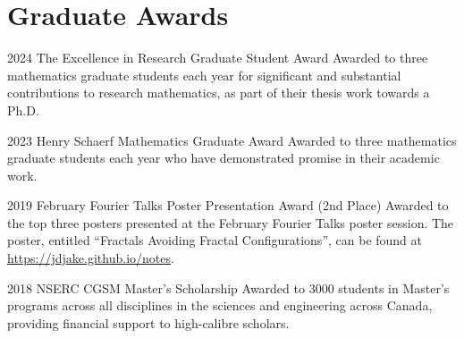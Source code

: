 \documentclass[a4paper]{cv-friggeri}
\begin{document}




\vspace{-1.5em} \section{Graduate Awards}

\begin{entrylist}

\entry
{2024}
{The Excellence in Research Graduate Student Award}
{}
{Awarded to three mathematics graduate students each year for significant and substantial contributions to research mathematics, as part of their thesis work towards a Ph.D.}

\entry
{2023}
{Henry Schaerf Mathematics Graduate Award}
{}
{Awarded to three mathematics graduate students each year who have demonstrated promise in their academic work.}

\entry
{2019}
{February Fourier Talks Poster Presentation Award (2nd Place)}
{}
{Awarded to the top three posters presented at the February Fourier Talks poster session. The poster, entitled ``Fractals Avoiding Fractal Configurations'', can be found at \href{https://jdjake.github.io/notes}{https://jdjake.github.io/notes}.}

\entry
{2018}
{NSERC CGSM Master's Scholarship}
{}
{Awarded to 3000 students in Master's programs across all disciplines in the sciences and engineering across Canada, providing financial support to high-calibre scholars.}%

\end{entrylist}

\end{document}
